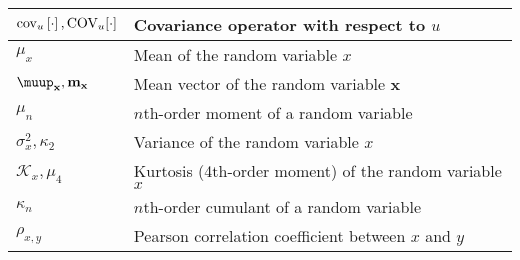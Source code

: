\documentclass{article}
\begin{document}
\begin{xltabular}{\textwidth}{XX}
	\(\cov[u]{\cdot}, \textnormal{COV}_u[\cdot]\)                                                                                                & Covariance operator with respect to \(u\)                                                                                                                               \\ \hline
	\(\mu_x\)                                                                                                                                    & Mean of the random variable \(x\)                                                                                                                                       \\ \hline
	\(\boldsymbol{\muup}_\mathbf{x}, \mathbf{m}_\mathbf{x}\)                                                                                     & Mean vector of the random variable \(\mathbf{x}\) \cite{brownIntroductionRandomSignals1997}                                                                             \\ \hline
	\(\mu_n\)                                                                                                                                    & \(n\)th-order moment of a random variable                                                                                                                               \\ \hline
	\(\sigma_x^2, \kappa_2\)                                                                                                                     & Variance of the random variable \(x\)                                                                                                                                   \\ \hline
	\(\mathcal{K}_x, \mu_4\)                                                                                                                     & Kurtosis (4th-order moment) of the random variable \(x\)                                                                                                                \\ \hline
	\(\kappa_n\)                                                                                                                                 & \(n\)th-order cumulant of a random variable                                                                                                                             \\ \hline
	\(\rho_{x,y}\)                                                                                                                               & Pearson correlation coefficient between \(x\) and \(y\)                                                                                                                 \\ \hline

\end{xltabular}
\end{document}
